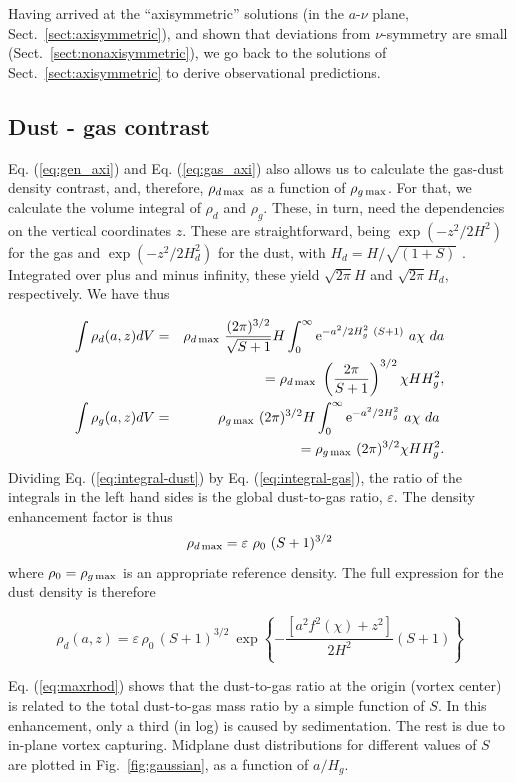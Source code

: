 \documentclass[apj]{emulateapj}
\newcommand{\Eq}[1]{Eq. (\ref{#1})}
\newcommand{\eq}[1]{\Eq{#1}}
\newcommand{\Fig}[1]{Fig.~\ref{#1}}
\newcommand{\fig}[1]{\Fig{#1}}
\newcommand{\sect}[1]{Sect.~\ref{#1}}
\newcommand{\beq}{\begin{equation}}
\newcommand{\eeq}{\end{equation}}
\newcommand{\beqn}{\begin{eqnarray}}
\newcommand{\eeqn}{\end{eqnarray}}
\begin{document}
Having arrived at the ``axisymmetric'' solutions (in the
  $a$-$\nu$ plane, \sect{sect:axisymmetric}), and shown that deviations from
  $\nu$-symmetry are small (\sect{sect:nonaxisymmetric}), we go back to
  the solutions of \sect{sect:axisymmetric} to derive observational predictions.

\subsection{Dust - gas contrast}

\eq{eq:gen_axi} and \eq{eq:gas_axi} also allows us to calculate the gas-dust
density contrast, and, therefore, $\rho_{d\,{\rm max}}$ as a function of
$\rho_{g\,{\rm max}}$. For that, we calculate the volume integral of $\rho_d$
and $\rho_g$. These, in turn, need the dependencies on the vertical
coordinates $z$. These are straightforward, being $\exp(-z^2/2H^2)$ for the gas and
$\exp(-z^2/2H_d^2)$ for the dust, with $H_d=H/\sqrt{(1+S)}$ \citep{Dubrulle95}. Integrated over plus and minus infinity, these yield $\sqrt{2\pi}H$ and
$\sqrt{2\pi}H_d$, respectively. We have thus

\beqn
\int\rho_d(a,z) dV  &=& \rho_{d\,{\rm max}} \ \frac{(2\pi)^{3/2}}{\sqrt{S+1}} H \int_0^\infty {\rm  e}^{-a^2/2H_g^2 \ (S+1)} \ a\chi \ da \notag\\
&&= \rho_{d\,{\rm max}} \ \left(\frac{2\pi}{S+1}\right)^{3/2} \chi H H_g^2, \label{eq:integral-dust}\\ 
%
\int\rho_g(a,z) dV  &=& \rho_{g\,{\rm max}} \ (2\pi)^{3/2} H \int_0^\infty {\rm e}^{-a^2/2H_g^2} \ a\chi \ da\ \notag\\
 &&= \rho_{g\,{\rm max}} \ (2\pi)^{3/2} \chi H H_g^2. \label{eq:integral-gas}\\
\eeqn 
\noindent Dividing \eq{eq:integral-dust} by \eq{eq:integral-gas}, the
ratio of the integrals in the left hand sides is the global dust-to-gas
ratio, $\varepsilon$. The density enhancement factor is thus
\beq
  \rho_{d\,{\rm max}} =  \varepsilon \ \rho_0 \ (S+1)^{3/2} \label{eq:maxrhod}
\eeq where $\rho_0=\rho_{g\,{\rm max}}$ is an appropriate reference
density. The full expression for the dust density is therefore

\beq
   \rho_d(a,z) = \varepsilon \, \rho_0 \, (S+1)^{3/2} \  \exp{\left\{-\frac{\left[a^2f^2(\chi) + z^2\right]}{2H^2}(S+1)\right\}} 
\label{eq:sect6-exp}
\eeq

\eq{eq:maxrhod} shows that the dust-to-gas ratio at the origin (vortex center)
is related to the total dust-to-gas mass ratio by a simple function of $S$.  
In this enhancement, only a third (in log) is caused by sedimentation. The
rest is due to in-plane vortex capturing. Midplane dust
distributions for different values of $S$ are plotted in \fig{fig:gaussian}, as a 
function of $a/H_g$. 
\end{document}
